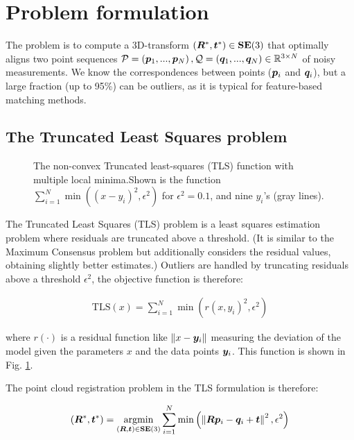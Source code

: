 
\section{Problem formulation}
The problem is to compute a 3D-transform $({\bm R}^*, \boldsymbol{t}^*) \in \mathbf{SE(\textrm{3})}$ that optimally aligns two point sequences $\mathcal{P} = \left(\boldsymbol{p}_1, ..., \boldsymbol{p}_N\right), \mathcal{Q} = \left(\boldsymbol{q}_1, ..., \boldsymbol{q}_N\right) \in \mathbb{R}^{3 \times N}$ of noisy measurements. We know the correspondences between points ($\boldsymbol{p}_i$ and $\boldsymbol{q}_i$), but a large fraction (up to 95\%) can be outliers, as it is typical for feature-based matching methods.
\subsection{The Truncated Least Squares problem}
\begin{figure}[!ht]
	\centering
	\begin{adjustbox}{width=1.\linewidth}
		
	\end{adjustbox}
	\caption{The non-convex Truncated least-squares (TLS) function with multiple local minima.Shown is the function  $\sum_{i=1}^{N}\min((x - y_i)^2, \epsilon^2)$ for $\epsilon^2=0.1$, and nine $y_i$'s (gray lines).}
	\label{fig:tlscostmulterm}
\end{figure}


The Truncated Least Squares (TLS) problem is a least squares estimation problem where residuals are truncated above a threshold. (It is similar to the Maximum Consensus problem but additionally considers the residual values, obtaining slightly better estimates.)
Outliers are handled by truncating residuals above a threshold $\epsilon^2$, the objective function is therefore:


\begin{equation}
	\begin{aligned}
		\text{TLS}(x) = \sum_{i=1}^{N}\min(r(x, y_i)^2, \epsilon^2)
	\end{aligned}
\end{equation}

where $r(\cdot)$ is a residual function like $\left\| x - \boldsymbol{y}_i \right\|$ measuring the deviation of the model given the parameters $x$ and the data points $\boldsymbol{y}_i$. This function is shown in Fig. \ref{fig:tlscostmulterm}.

The point cloud registration problem in the TLS formulation is therefore:

\begin{equation}
	\label{eq:pcr-tls}
	\begin{aligned}
		({\bm R}^*, \boldsymbol{t}^*) =  \operatorname*{argmin}_{({\bm R}, \boldsymbol{t}) \in \mathbf{SE(\textrm{3})}}  \sum_{i=1}^{N} \min \left(\left\|{\bm R} \boldsymbol{p}_i  - \boldsymbol{q}_i  + \boldsymbol{t}\right\|^2, \epsilon^2 \right)
	\end{aligned}
\end{equation}

